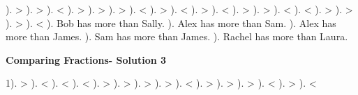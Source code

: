 \documentclass{article}%
\begin{document}
). >%
). >%
). <%
). >%
). >%
). >%
). <%
). >%
). <%
). >%
). <%
). >%
). >%
). <%
). <%
). >%
). >%
). >%
). <%
). Bob has more than Sally.%
). Alex has more than Sam.%
). Alex has more than James.%
). Sam has more than James.%
). Rachel has more than Laura.%
\newline%
\newpage%
\large%
\begin{center}%
\textbf{Comparing Fractions- Solution 3}%
\newline%
\end{center} \normalsize%
1). >%
). <%
). <%
). <%
). >%
). >%
). >%
). >%
). <%
). >%
). >%
). >%
). <%
). >%
). <%
\end{document}
